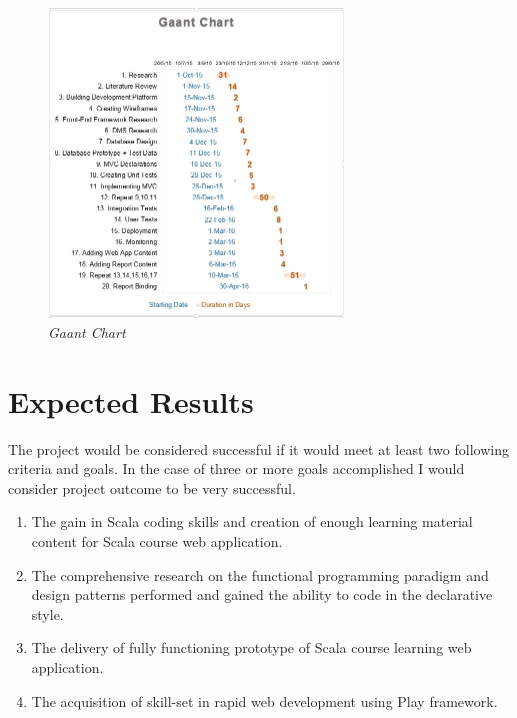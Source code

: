 \documentclass[12pt,twoside,a4paper]{report}
\begin{document}
\begin{figure}[!ht]
	\centering
		\includegraphics[width=0.7\textwidth,totalheight=7cm]{gaant}
	\caption{\textit{Gaant Chart}}
\end{figure}

\section{Expected Results}
The project would be considered successful if it would meet at least two following criteria and goals. In the case of three or more goals accomplished I would consider project outcome to be very successful.

\begin{enumerate}
\item The gain in Scala coding skills and creation of enough learning material content for Scala course web application.
\item The comprehensive research on the functional programming paradigm and design patterns performed and gained the ability to code in the declarative style.
\item The delivery of fully functioning prototype of Scala course learning web application.
\item The acquisition of skill-set in rapid web development using Play framework.
\end{enumerate}
\end{document}
